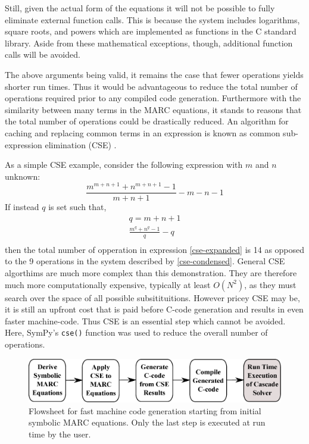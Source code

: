 \documentclass[preprint,12pt]{elsarticle}
\begin{document}
Still, given the actual form of the equations it will not be possible to fully 
eliminate external function calls.  This is because the system includes logarithms, 
square roots, and powers which are implemented as functions in the C standard library.
Aside from these mathematical exceptions, though, additional function calls will
be avoided.

The above arguments being valid, it remains the case that fewer operations yields
shorter run times.  Thus it would be advantageous to reduce the total number of 
operations required prior to any compiled code generation.  Furthermore with the
similarity between many terms in the MARC equations, it stands to reasons that the
total number of operations could be drastically reduced.  An algorithm for 
caching and replacing common terms in an expression is known as common 
sub-expression elimination (CSE) \cite{Cocke:1970:GCS:390013.808480}.

As a simple CSE example, consider the following expression with $m$ and $n$ unknown:
\begin{equation}
\frac{m^{m+n+1} + n^{m+n+1} - 1}{m + n + 1} - m - n - 1
\label{cse-expanded}
\end{equation}
If instead $q$ is set such that,
\begin{equation}
\begin{array}{l}
q = m + n + 1\\
\frac{m^{q} + n^{q} - 1}{q} - q\\
\end{array}
\label{cse-condensed}
\end{equation}
then the total number of opperation in expression \ref{cse-expanded} is 14 as
opposed to the 9 operations in the system described by \ref{cse-condensed}.
General CSE algorthims are much more complex than this demonstration.  They are
therefore much more computationally expensive, typically at least $O(N^2)$, as
they must search over the space of all possible subsitituitions.  However pricey
CSE may be, it is still an upfront cost that is paid before C-code generation and
results in even faster machine-code.  Thus CSE is an essential step which cannot be 
avoided.  Here, SymPy's \texttt{cse()} function was used to reduce the overall 
number of operations.

\begin{figure}
\begin{center}
\includegraphics[scale=0.45]{codegen_pipeline.eps}
\caption{Flowsheet for fast machine code generation starting from initial symbolic MARC
equations.  Only the last step is executed at run time by the user.}
\end{center}
\label{codegen_pipeline}
\end{figure}
\end{document}
